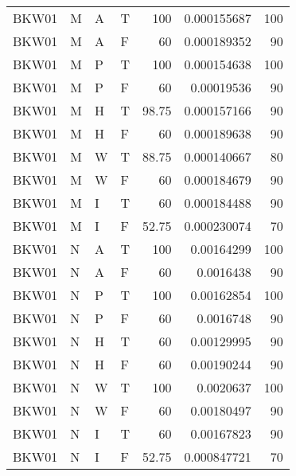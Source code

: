 \begin{tabular}{llllrrr}
    BKW01    & M     & A     & T          & 100        & 0.000155687 & 100      \\
    BKW01    & M     & A     & F          & 60         & 0.000189352 & 90       \\
    BKW01    & M     & P     & T          & 100        & 0.000154638 & 100      \\
    BKW01    & M     & P     & F          & 60         & 0.00019536  & 90       \\
    BKW01    & M     & H     & T          & 98.75      & 0.000157166 & 90       \\
    BKW01    & M     & H     & F          & 60         & 0.000189638 & 90       \\
    BKW01    & M     & W     & T          & 88.75      & 0.000140667 & 80       \\
    BKW01    & M     & W     & F          & 60         & 0.000184679 & 90       \\
    BKW01    & M     & I     & T          & 60         & 0.000184488 & 90       \\
    BKW01    & M     & I     & F          & 52.75      & 0.000230074 & 70       \\
    BKW01    & N     & A     & T          & 100        & 0.00164299  & 100      \\
    BKW01    & N     & A     & F          & 60         & 0.0016438   & 90       \\
    BKW01    & N     & P     & T          & 100        & 0.00162854  & 100      \\
    BKW01    & N     & P     & F          & 60         & 0.0016748   & 90       \\
    BKW01    & N     & H     & T          & 60         & 0.00129995  & 90       \\
    BKW01    & N     & H     & F          & 60         & 0.00190244  & 90       \\
    BKW01    & N     & W     & T          & 100        & 0.0020637   & 100      \\
    BKW01    & N     & W     & F          & 60         & 0.00180497  & 90       \\
    BKW01    & N     & I     & T          & 60         & 0.00167823  & 90       \\
    BKW01    & N     & I     & F          & 52.75      & 0.000847721 & 70       \\
    \hline
\end{tabular}